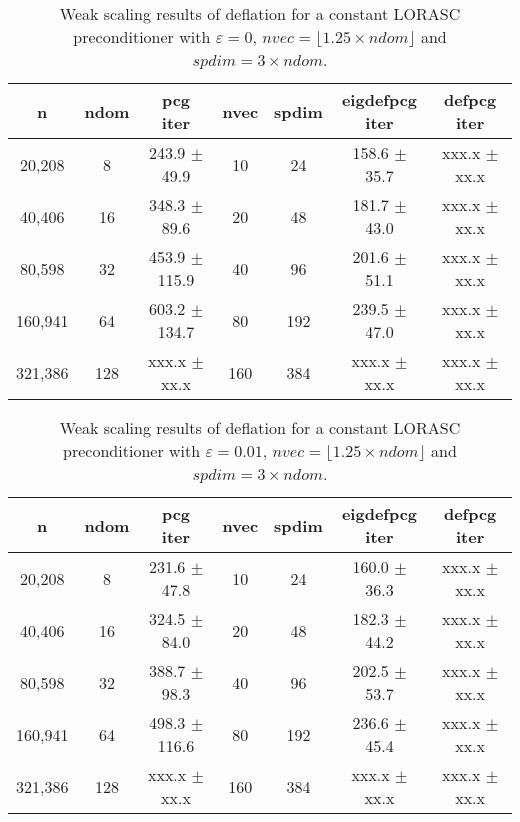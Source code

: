 \documentclass{article}
\begin{document}
\begin{table}[ht]
\caption{Weak scaling results of deflation for a constant LORASC preconditioner with $\varepsilon=0$, $nvec=\lfloor1.25\times ndom\rfloor$ and $spdim=3\times ndom$.}
\centering
	\begin{tabular}{|c|c|c|c|c|c|c|}
	\hline
	n & ndom & \makecell{pcg\\ iter} & nvec & spdim & \makecell{eigdefpcg\\ iter} & \makecell{defpcg\\ iter}\\
	\hline
	20,208  &   8 & 243.9 $\pm$  49.9 &  10 &  24 & 158.6 $\pm$ 35.7 & xxx.x $\pm$ xx.x \\
	40,406  &  16 & 348.3 $\pm$  89.6 &  20 &  48 & 181.7 $\pm$ 43.0 & xxx.x $\pm$ xx.x \\
	80,598  &  32 & 453.9 $\pm$ 115.9 &  40 &  96 & 201.6 $\pm$ 51.1 & xxx.x $\pm$ xx.x \\
	160,941 &  64 & 603.2 $\pm$ 134.7 &  80 & 192 & 239.5 $\pm$ 47.0 & xxx.x $\pm$ xx.x \\
	321,386 & 128 & xxx.x $\pm$  xx.x & 160 & 384 & xxx.x $\pm$ xx.x & xxx.x $\pm$ xx.x \\
	\hline
\end{tabular}
\label{Tab:010}
\end{table}

\begin{table}[ht]
	\caption{Weak scaling results of deflation for a constant LORASC preconditioner with $\varepsilon=0.01$, $nvec=\lfloor1.25\times ndom\rfloor$ and $spdim=3\times ndom$.}
	\centering
	\begin{tabular}{|c|c|c|c|c|c|c|}
	\hline
	n & ndom & \makecell{pcg\\ iter} & nvec & spdim & \makecell{eigdefpcg\\ iter} & \makecell{defpcg\\ iter}\\
	\hline
	20,208  &   8 & 231.6 $\pm$  47.8 &  10 &  24 & 160.0 $\pm$ 36.3 & xxx.x $\pm$ xx.x \\
	40,406  &  16 & 324.5 $\pm$  84.0 &  20 &  48 & 182.3 $\pm$ 44.2 & xxx.x $\pm$ xx.x \\
	80,598  &  32 & 388.7 $\pm$  98.3 &  40 &  96 & 202.5 $\pm$ 53.7 & xxx.x $\pm$ xx.x \\
	160,941 &  64 & 498.3 $\pm$ 116.6 &  80 & 192 & 236.6 $\pm$ 45.4 & xxx.x $\pm$ xx.x \\
	321,386 & 128 & xxx.x $\pm$  xx.x & 160 & 384 & xxx.x $\pm$ xx.x & xxx.x $\pm$ xx.x \\
	\hline
\end{tabular}
	\label{Tab:015}
\end{table}
\end{document}

